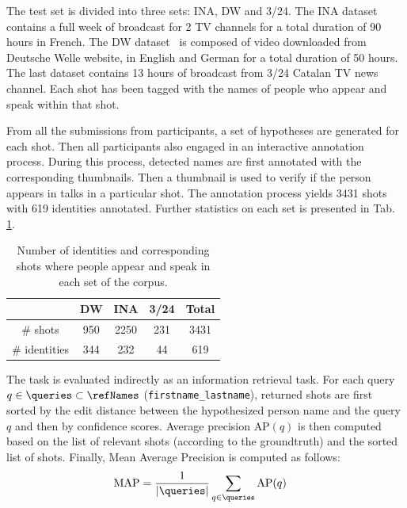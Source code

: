  The test set is divided into three sets: INA, DW and 3/24. The INA dataset contains a full week of broadcast for 2 TV channels for a total duration of 90 hours in French. The DW dataset~\cite{EUMSSI} is composed of video downloaded from Deutsche Welle website, in English and German for a total duration of 50 hours. The last dataset contains 13 hours of broadcast from 3/24 Catalan TV news channel. Each shot has been tagged with the names of people who appear and speak within that shot.

From all the submissions from participants, a set of hypotheses are generated for each shot. Then all participants also engaged in an interactive annotation process. During this process, detected names are first annotated with the corresponding thumbnails. Then a thumbnail is used to verify if the person appears in talks in a particular shot. The annotation process yields 3431 shots with 619 identities annotated. Further statistics on each set is presented in Tab. \ref{tab:stats}.

\begin{table}[tb]
\centering
\caption{Number of identities and corresponding shots where people appear and speak in each set of the corpus.}
\vspace*{-2mm}
\begin{tabular}{c|c|c|c|c|}
\cline{2-5}
    						   		& DW  	& INA 	& 3/24  & Total\\ \hline
 \multicolumn{1}{|c|}{\# shots} 		& 950	& 2250  & 231 & 3431\\ \hline

 \multicolumn{1}{|c|}{\# identities} 	& 344	& 232   & 44 & 619 \\ \hline
								
\end{tabular}
%
\vspace*{-5mm}
\label{tab:stats}
\end{table}



 The task is evaluated indirectly as an information retrieval task.%
%
For each query $q \in \queries \subset \refNames$ (\texttt{first\-name\_lastname}), returned shots are first sorted by the edit distance between the hypothesized person name and the query $q$ and then by confidence scores.
Average precision $\text{AP}(q)$ is then computed based on the list of relevant shots (according to the groundtruth) and the sorted list of shots. Finally, Mean Average Precision is computed as follows:
\begin{align}
            \text{MAP} & = \frac{1}{|\queries|} \sum_{q \in \queries} \text{AP}(q) \nonumber
\end{align}

